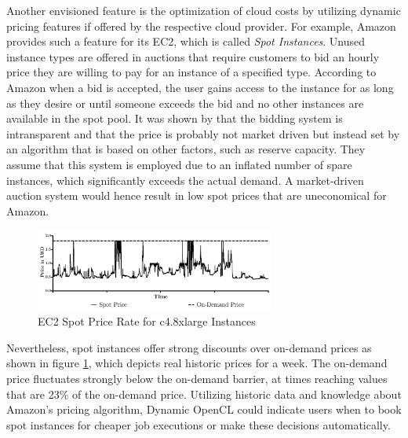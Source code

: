 Another envisioned feature is the optimization of cloud costs by utilizing dynamic pricing features if offered by the respective cloud provider. For example, Amazon provides such a feature for its EC2, which is called \textit{Spot Instances}. Unused instance types are offered in auctions that require customers to bid an hourly price they are willing to pay for an instance of a specified type. According to Amazon when a bid is accepted, the user gains access to the instance for as long as they desire or until someone exceeds the bid and no other instances are available in the spot pool\cite{spot_instances}. It was shown by \citeauthor{spot_instance_pricing} that the bidding system is intransparent and that the price is probably not market driven but instead set by an algorithm that is based on other factors, such as reserve capacity\cite{spot_instance_pricing}. They assume that this system is employed due to an inflated number of spare instances, which significantly exceeds the actual demand. A market-driven auction system would hence result in low spot prices that are uneconomical for Amazon.
\begin{figure}[!htb]
	\includegraphics[width=0.7\textwidth]{images/ec2_spot_prices.pdf}
	\centering
	\caption{EC2 Spot Price Rate for c4.8xlarge Instances}
	\label{img:spot_pricing}
\end{figure}
Nevertheless, spot instances offer strong discounts over on-demand prices as shown in figure \ref{img:spot_pricing}, which depicts real historic prices for a week. The on-demand price fluctuates strongly below the on-demand barrier, at times reaching values that are 23\% of the on-demand price. Utilizing historic data and knowledge about Amazon's pricing algorithm, Dynamic OpenCL could indicate users when to book spot instances for cheaper job executions or make these decisions automatically.

